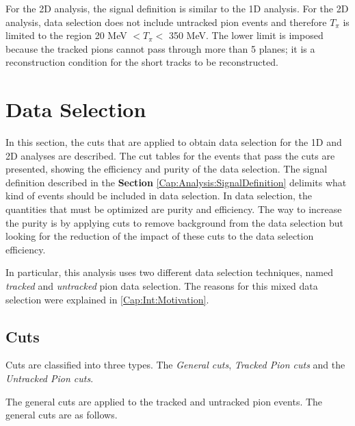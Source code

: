 For the 2D analysis, the signal definition is similar to the 1D analysis. For the 2D analysis, data selection does not include untracked pion events and therefore $T_\pi$ is limited to the region 20 MeV $<T_\pi<$ 350 MeV. The lower limit is imposed because the tracked pions cannot pass through more than 5 planes; it is a reconstruction condition for the short tracks to be reconstructed. 





\section{Data Selection}
\label{Cap:Analysis:DataSelection}

In this section, the cuts that are applied to obtain data selection for the 1D and 2D analyses are described. The cut tables for the events that pass the cuts are presented, showing the efficiency and purity of the data selection. The signal definition described in the \textbf{Section} \ref{Cap:Analysis:SignalDefinition} delimits what kind of events should be included in data selection. In data selection, the quantities that must be optimized are purity and efficiency. The way to increase the purity is by applying cuts to remove background from the data selection but looking for the reduction of the impact of these cuts to the data selection efficiency. 

In particular, this analysis uses two different data selection techniques, named \textit{tracked} and \textit{untracked }pion data selection. The reasons for this mixed data selection were explained in \ref{Cap:Int:Motivation}.


\subsection{Cuts}
\label{Cap:Analysis:DataSelection:Cuts}

Cuts are classified into three types. The \textit{General cuts}, \textit{Tracked Pion cuts} and the \textit{Untracked Pion cuts}. 

The general cuts are applied to the tracked and untracked pion events. The general cuts are as follows.

